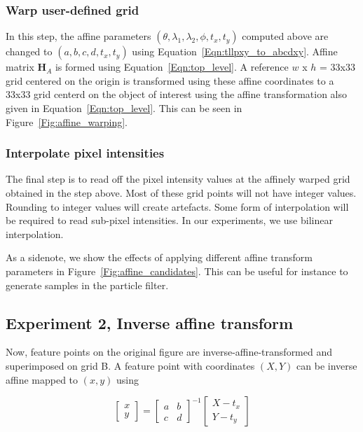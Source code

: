 \subsubsection{Warp user-defined grid}
In this step, the affine parameters $(\theta, \lambda_1, \lambda_2, \phi, t_x, t_y)$ computed above are changed to $(a, b, c, d, t_x, t_y)$ using Equation~\ref{Eqn:tllpxy_to_abcdxy}.  Affine matrix $\mathbf{H}_A$ is formed using Equation~\ref{Eqn:top_level}.  A reference $w$ x $h$ = 33x33 grid centered on the origin is transformed using these affine coordinates to a 33x33 grid centerd on the object of interest using the affine transformation also given in Equation~\ref{Eqn:top_level}.  This can be seen in Figure~\ref{Fig:affine_warping}.

\subsubsection{Interpolate pixel intensities}
The final step is to read off the pixel intensity values at the affinely warped grid obtained in the step above.  Most of these grid points will not have integer values.  Rounding to integer values will create artefacts.  Some form of interpolation will be required to read sub-pixel intensities.  In our experiments, we use bilinear interpolation. 

As a sidenote, we show the effects of applying different affine transform parameters in Figure~\ref{Fig:affine_candidates}.  This can be useful for instance to generate samples in the particle filter.


\subsection{Experiment 2, Inverse affine transform}
Now, feature points on the original figure are inverse-affine-transformed and superimposed on grid B.  A feature point with coordinates $(X,Y)$ can be inverse affine mapped to $(x,y)$ using

\begin{equation}
\left[\begin{array}{ccc}
x 
\\ 
y
\end{array}
\right]
=
\left[\begin{array}{ccc}
a & b\\ 
c & d
\end{array}
\right]^{-1}
\left[\begin{array}{ccc}
X - t_x  
\\ 
Y - t_y
\end{array}
\right]
\end{equation}

